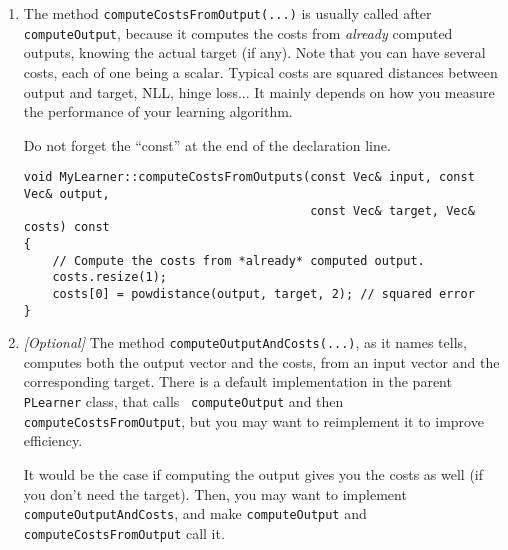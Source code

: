 \documentclass[11pt]{book}
\begin{document}
\begin{enumerate}
\begin{verbatim}
void MyLearner::computeOutput(const Vec& input, Vec& output) const
{
    // Compute the output from the input.
    int nout = outputsize();
    output.resize(nout);

    if( method == 0 )
    {
        tmp += sum(input);
        output << tmp;
    }
    else if( method == 1 )
    {
        output.subVec(0,input.length()) << input;
        output[ inputsize() ] = sum(tmp);
    }
    else if( method == 2 )
    {
        if( inputsize() != 42 )
            PLERROR("MyLearner::computeOutput: inputsize() is '%d', but\n"
                    "Learning method 'second' only works when inputsize() =="
                    " 42.\n", inputsize());
        output.subVec(0,42) << input;
        output.subVec(42,42) << tmp;
    }
}
\end{verbatim}

\item The method {\tt computeCostsFromOutput(...)} is usually called
after {\tt computeOutput}, because it computes the costs from {\em
already} computed outputs, knowing the actual target (if any). Note that
you can have several costs, each of one being a scalar. Typical costs
are squared distances between output and target, NLL, hinge loss...
It mainly depends on how you measure the performance of your learning
algorithm.

Do not forget the ``const'' at the end of the declaration line.
\begin{verbatim}
void MyLearner::computeCostsFromOutputs(const Vec& input, const Vec& output,
                                        const Vec& target, Vec& costs) const
{
    // Compute the costs from *already* computed output.
    costs.resize(1);
    costs[0] = powdistance(output, target, 2); // squared error
}
\end{verbatim}

\item {\em [Optional]} The method {\tt computeOutputAndCosts(...)},
as it names tells, computes both the output vector and the costs,
from an input vector and the corresponding target. There is a default
implementation in the parent {\tt PLearner} class, that calls {\tt
computeOutput} and then {\tt computeCostsFromOutput}, but you may want
to reimplement it to improve efficiency.

It would be the case if computing the output gives you the costs as
well (if you don't need the target). Then, you may want to implement
{\tt computeOutputAndCosts}, and make {\tt computeOutput} and {\tt
computeCostsFromOutput} call it.


\end{enumerate}
\end{document}
